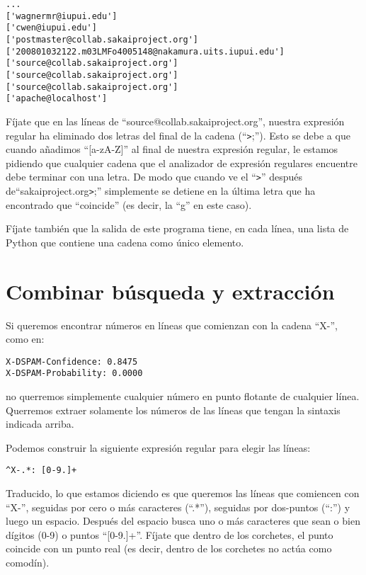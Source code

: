 \beforeverb
\begin{verbatim}
...
['wagnermr@iupui.edu']
['cwen@iupui.edu']
['postmaster@collab.sakaiproject.org']
['200801032122.m03LMFo4005148@nakamura.uits.iupui.edu']
['source@collab.sakaiproject.org']
['source@collab.sakaiproject.org']
['source@collab.sakaiproject.org']
['apache@localhost']
\end{verbatim}
\afterverb
%
Fíjate que en las líneas de ``source@collab.sakaiproject.org'', nuestra expresión regular
ha eliminado dos letras del final de la cadena (``\verb">";''). Esto se debe a que cuando
añadimos ``[a-zA-Z]'' al final de nuestra expresión regular, le estamos pidiendo que cualquier
cadena que el analizador de expresión regulares encuentre debe terminar con una letra. De modo que cuando ve el
``\verb">"'' después de``sakaiproject.org\verb">";'' simplemente se detiene en la última letra que
ha encontrado que ``coincide'' (es decir, la ``g'' en este caso).

Fíjate también que la salida de este programa tiene, en cada línea, una lista de Python que contiene una cadena como
único elemento.

\section{Combinar búsqueda y extracción}

Si queremos encontrar números en líneas que comienzan con la cadena ``X-'', como en:

\beforeverb
\begin{verbatim}
X-DSPAM-Confidence: 0.8475
X-DSPAM-Probability: 0.0000  
\end{verbatim}
\afterverb
%
no querremos simplemente cualquier número en punto flotante de cualquier línea. Querremos extraer
solamente los números de las líneas que tengan la sintaxis indicada arriba.

Podemos construir la siguiente expresión regular para elegir las líneas:

\beforeverb
\begin{verbatim}
^X-.*: [0-9.]+
\end{verbatim}
\afterverb
%
Traducido, lo que estamos diciendo es que queremos las líneas que comiencen con ``X-'', seguidas por cero o
más caracteres (``.*''), seguidas por dos-puntos (``:'') y luego un espacio. Después del espacio busca
uno o más caracteres que sean o bien dígitos (0-9) o puntos ``[0-9.]+''.
Fíjate que dentro de los corchetes, el punto coincide con un punto real (es decir, dentro de los corchetes
no actúa como comodín).

